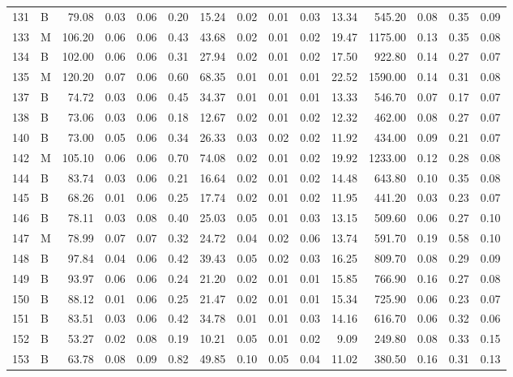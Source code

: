 \begin{table}[ht]
\begin{tabular}{rlrrrrrrrrrrrrr}
  131 & B & 79.08 & 0.03 & 0.06 & 0.20 & 15.24 & 0.02 & 0.01 & 0.03 & 13.34 & 545.20 & 0.08 & 0.35 & 0.09 \\ 
  133 & M & 106.20 & 0.06 & 0.06 & 0.43 & 43.68 & 0.02 & 0.01 & 0.02 & 19.47 & 1175.00 & 0.13 & 0.35 & 0.08 \\ 
  134 & B & 102.00 & 0.06 & 0.06 & 0.31 & 27.94 & 0.02 & 0.01 & 0.02 & 17.50 & 922.80 & 0.14 & 0.27 & 0.07 \\ 
  135 & M & 120.20 & 0.07 & 0.06 & 0.60 & 68.35 & 0.01 & 0.01 & 0.01 & 22.52 & 1590.00 & 0.14 & 0.31 & 0.08 \\ 
  137 & B & 74.72 & 0.03 & 0.06 & 0.45 & 34.37 & 0.01 & 0.01 & 0.01 & 13.33 & 546.70 & 0.07 & 0.17 & 0.07 \\ 
  138 & B & 73.06 & 0.03 & 0.06 & 0.18 & 12.67 & 0.02 & 0.01 & 0.02 & 12.32 & 462.00 & 0.08 & 0.27 & 0.07 \\ 
  140 & B & 73.00 & 0.05 & 0.06 & 0.34 & 26.33 & 0.03 & 0.02 & 0.02 & 11.92 & 434.00 & 0.09 & 0.21 & 0.07 \\ 
  142 & M & 105.10 & 0.06 & 0.06 & 0.70 & 74.08 & 0.02 & 0.01 & 0.02 & 19.92 & 1233.00 & 0.12 & 0.28 & 0.08 \\ 
  144 & B & 83.74 & 0.03 & 0.06 & 0.21 & 16.64 & 0.02 & 0.01 & 0.02 & 14.48 & 643.80 & 0.10 & 0.35 & 0.08 \\ 
  145 & B & 68.26 & 0.01 & 0.06 & 0.25 & 17.74 & 0.02 & 0.01 & 0.02 & 11.95 & 441.20 & 0.03 & 0.23 & 0.07 \\ 
  146 & B & 78.11 & 0.03 & 0.08 & 0.40 & 25.03 & 0.05 & 0.01 & 0.03 & 13.15 & 509.60 & 0.06 & 0.27 & 0.10 \\ 
  147 & M & 78.99 & 0.07 & 0.07 & 0.32 & 24.72 & 0.04 & 0.02 & 0.06 & 13.74 & 591.70 & 0.19 & 0.58 & 0.10 \\ 
  148 & B & 97.84 & 0.04 & 0.06 & 0.42 & 39.43 & 0.05 & 0.02 & 0.03 & 16.25 & 809.70 & 0.08 & 0.29 & 0.09 \\ 
  149 & B & 93.97 & 0.06 & 0.06 & 0.24 & 21.20 & 0.02 & 0.01 & 0.01 & 15.85 & 766.90 & 0.16 & 0.27 & 0.08 \\ 
  150 & B & 88.12 & 0.01 & 0.06 & 0.25 & 21.47 & 0.02 & 0.01 & 0.01 & 15.34 & 725.90 & 0.06 & 0.23 & 0.07 \\ 
  151 & B & 83.51 & 0.03 & 0.06 & 0.42 & 34.78 & 0.01 & 0.01 & 0.03 & 14.16 & 616.70 & 0.06 & 0.32 & 0.06 \\ 
  152 & B & 53.27 & 0.02 & 0.08 & 0.19 & 10.21 & 0.05 & 0.01 & 0.02 & 9.09 & 249.80 & 0.08 & 0.33 & 0.15 \\ 
  153 & B & 63.78 & 0.08 & 0.09 & 0.82 & 49.85 & 0.10 & 0.05 & 0.04 & 11.02 & 380.50 & 0.16 & 0.31 & 0.13 \\ 

\end{tabular}
\end{table}
